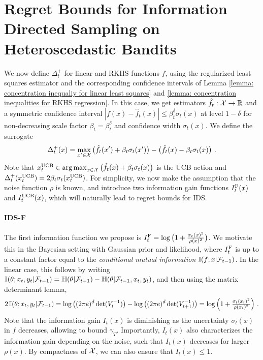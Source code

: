 \section{Regret Bounds for Information Directed Sampling on Heteroscedastic Bandits}\label{section: regret guarantees for ids}
We now define $\Delta_t^+$ for linear and RKHS functions $f$, using the regularized least squares estimator and the corresponding confidence intervals of Lemma \ref{lemma: concentration inequaliy for linear least squares} and \ref{lemma: concentration inequalities for RKHS regression}. In this case, we get estimators $\hat{f}_t : \mathcal{X} \rightarrow \mathbb{R}$ and a symmetric confidence interval $|f(x) - \hat{f}_t(x)| \leq \beta_t^\delta \sigma_t(x)$ at level $1-\delta$ for non-decreasing scale factor $\beta_t = \beta_t^\delta$ and confidence width $\sigma_t(x)$. We define the surrogate
\begin{align*}
\Delta_t^+(x) = \max_{x' \in \mathcal{X}} \big(\hat{f}_t(x') + \beta_t \sigma_t(x')\big) - \big(\hat{f}_t(x) - \beta_t \sigma_t(x) \big) \text{ .}
\end{align*}
Note that $x_t^{\text{UCB}} \in \operatorname*{arg\,max}_{x \in \mathcal{X}} \big(\hat{f}_t(x) + \beta_t \sigma_t(x)\big)$ is the UCB action and $\Delta_t^+(x_t^{\text{UCB}}) = 2 \beta_t \sigma_t(x_t^{\text{UCB}})$. For simplicity, we now make the assumption that the noise function $\rho$ is known, and introduce two information gain functions $I_t^{\text{F}}(x)$ and $I_t^{\text{UCB}}(x)$, which will naturally lead to regret bounds for IDS.
\paragraph{IDS-F}
The first information function we propose is $I_t^{\text{F}} = \log\big(1 + \frac{\sigma_t(x)^2}{\rho(x)^2}\big)$. We motivate \vspace{-2pt} this in the Bayesian setting with Gaussian prior and likelihood, where $I_t^{\text{F}}$ is up to a constant factor equal to the \emph{conditional mutual information} $\mathbb{I}(f; x|\mathcal{F}_{t-1})$. In the linear case, this follows by writing $\mathbb{I}(\theta; x_t,y_t|\mathcal{F}_{t-1}) = \mathbb{H}(\theta|\mathcal{F}_{t-1}) - \mathbb{H}(\theta|\mathcal{F}_{t-1}, x_t,y_t)$, and then using the matrix determinant lemma,
\begin{align*}
2\,\mathbb{I}(\theta; x_t,y_t|\mathcal{F}_{t-1}) = \log\big((2\pi e)^d \det(V_t^{-1})\big) - \log\big((2\pi e)^d \det(V_{t+1}^{-1})\big) =  \log\Big(1 + \tfrac{\sigma_t(x_t)^2}{\rho(x_t)^2}\Big) \text{ .}
\end{align*}
Note that the information gain $I_t(x)$ is diminishing as the uncertainty $\sigma_t(x)$ in $f$ decreases, allowing to bound $\gamma_T$. Importantly, $I_t(x)$ also characterizes the information gain depending on the noise, such that $I_t(x)$ decreases for larger $\rho(x)$. By compactness of $\mathcal{X}$, we can also ensure that $I_t(x) \leq 1$. 

